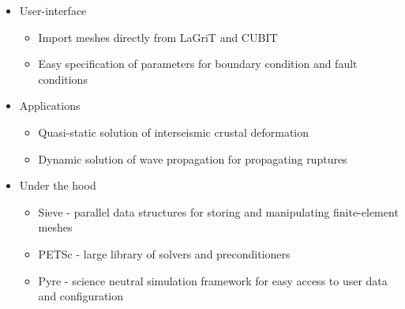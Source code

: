 \documentclass[pdftex,cig,slideColor]{pp4slides}
\begin{document}
  \summary{}

  \begin{itemize}
  \item User-interface
    \begin{itemize}
    \item Import meshes directly from LaGriT and CUBIT
    \item Easy specification of parameters for boundary condition and
      fault conditions
    \end{itemize}
  \item Applications
    \begin{itemize}
    \item Quasi-static solution of interseismic crustal deformation
    \item Dynamic solution of wave propagation for propagating ruptures
    \end{itemize}
  \item Under the hood
    \begin{itemize}
    \item Sieve - parallel data structures for storing and
      manipulating finite-element meshes
    \item PETSc - large library of solvers and preconditioners
    \item Pyre - science neutral simulation framework for easy access
      to user data and configuration
    \end{itemize}
  \end{itemize}

\end{document}
